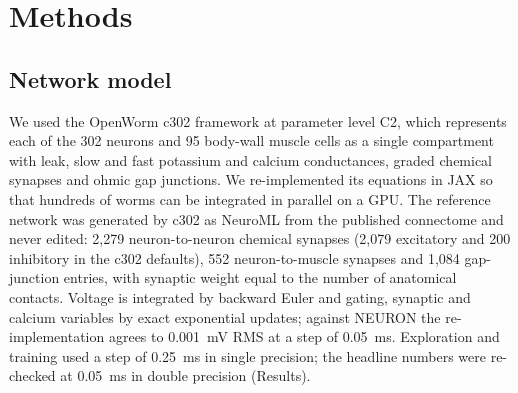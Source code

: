 \documentclass[11pt,a4paper]{article}
\begin{document}
\section*{Methods}

\subsection*{Network model}
We used the OpenWorm c302 framework \cite{r6} at parameter level C2, which represents each of the 302 neurons and 95 body-wall muscle cells as a single compartment with leak, slow and fast potassium and calcium conductances, graded chemical synapses and ohmic gap junctions. We re-implemented its equations in JAX so that hundreds of worms can be integrated in parallel on a GPU. The reference network was generated by c302 as NeuroML from the published connectome \cite{r4,r5} and never edited: 2,279 neuron-to-neuron chemical synapses (2,079 excitatory and 200 inhibitory in the c302 defaults), 552 neuron-to-muscle synapses and 1,084 gap-junction entries, with synaptic weight equal to the number of anatomical contacts. Voltage is integrated by backward Euler and gating, synaptic and calcium variables by exact exponential updates; against NEURON the re-implementation agrees to 0.001~mV RMS at a step of 0.05~ms. Exploration and training used a step of 0.25~ms in single precision; the headline numbers were re-checked at 0.05~ms in double precision (Results).
\end{document}

